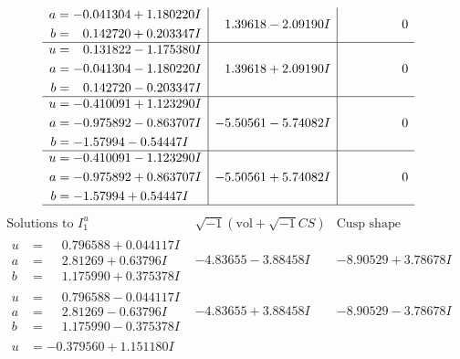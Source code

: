 \documentclass[1p]{elsarticle_modified}
\theoremstyle{definition}
\newcommand{\I}{\sqrt{-1}}
\begin{document}
$$\begin{array}{c|c|c}
\begin{aligned}
a &= -0.041304 + 1.180220 I \\
b &= \phantom{-}0.142720 + 0.203347 I\end{aligned}
 & \phantom{-}1.39618 - 2.09190 I & \phantom{-0.000000 } 0 \\ \hline\begin{aligned}
u &= \phantom{-}0.131822 - 1.175380 I \\
a &= -0.041304 - 1.180220 I \\
b &= \phantom{-}0.142720 - 0.203347 I\end{aligned}
 & \phantom{-}1.39618 + 2.09190 I & \phantom{-0.000000 } 0 \\ \hline\begin{aligned}
u &= -0.410091 + 1.123290 I \\
a &= -0.975892 - 0.863707 I \\
b &= -1.57994 - 0.54447 I\end{aligned}
 & -5.50561 - 5.74082 I & \phantom{-0.000000 } 0 \\ \hline\begin{aligned}
u &= -0.410091 - 1.123290 I \\
a &= -0.975892 + 0.863707 I \\
b &= -1.57994 + 0.54447 I\end{aligned}
 & -5.50561 + 5.74082 I & \phantom{-0.000000 } 0\\
 \hline 
 \end{array}$$\newpage$$\begin{array}{c|c|c}  
\text{Solutions to }I^u_{1}& \I (\text{vol} + \sqrt{-1}CS) & \text{Cusp shape}\\
 \hline 
\begin{aligned}
u &= \phantom{-}0.796588 + 0.044117 I \\
a &= \phantom{-}2.81269 + 0.63796 I \\
b &= \phantom{-}1.175990 + 0.375378 I\end{aligned}
 & -4.83655 - 3.88458 I & -8.90529 + 3.78678 I \\ \hline\begin{aligned}
u &= \phantom{-}0.796588 - 0.044117 I \\
a &= \phantom{-}2.81269 - 0.63796 I \\
b &= \phantom{-}1.175990 - 0.375378 I\end{aligned}
 & -4.83655 + 3.88458 I & -8.90529 - 3.78678 I \\ \hline\begin{aligned}
u &= -0.379560 + 1.151180 I \\

\end{aligned}
\end{array}$$
\end{document}
